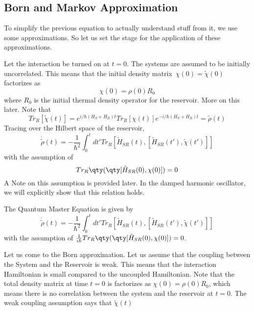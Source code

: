 \documentclass{scrartcl}
\newcommand{\1}{\mathbbm{1}}
\begin{document}
\subsection{Born and Markov Approximation}
To simplify the previous equation to actually understand stuff from it, we use some approximations. So let us set the stage
for the application of these approximations.

Let the interaction be turned on at $t=0$. The systems are assumed to be initially uncorrelated. This means that the initial density matrix\
$\chi(0) = \tilde{\chi}(0)$ factorizes as
\begin{equation}
	\chi(0) = \rho(0) R_0
\end{equation}
where $R_0$ is the initial thermal density operator for the reservoir. More on this later. Note that
\begin{equation*}
	Tr_R[\tilde{\chi}(t)] = e^{i\slash \hbar (H_S + H_R)t} Tr_R[\chi (t)] e^{-i\slash \hbar (H_S + H_R)t} = \tilde{\rho}(t)
\end{equation*}
Tracing over the Hilbert space of the reservoir,
\begin{equation*}
	\dot{\tilde{\rho}}(t) = -\frac{1}{\hbar^2} \int_0^t dt' Tr_R[\tilde{H}_{SR}(t), [\tilde{H}_{SR}(t'), \tilde{\chi}(t')]]
\end{equation*}
with the assumption of
\begin{equation}
	Tr_R\qty(\qty[\tilde{H}_{SR}(0),\chi (0)]) = 0
\end{equation}
A Note on this assumption is provided later. In the damped harmonic oscillator, we will explicitly show
that this relation holds.
\begin{definition}
	The Quantum Master Equation is given by
	\begin{equation}
		\dot{\tilde{\rho}}(t) = -\frac{1}{\hbar^2} \int_0^t dt' Tr_R[\tilde{H}_{SR}(t), [\tilde{H}_{SR}(t'), \tilde{\chi}(t')]]
	\end{equation}
	with the assumption of $\frac{1}{i\hbar} Tr_R\qty(\qty[\tilde{H}_{SR}(0),\chi (0)]) = 0$.
\end{definition}
Let us come to the Born approximation. Let us assume that the coupling between the System and the Reservoir is weak.
This means that the interaction Hamiltonian is small compared to the uncoupled Hamiltonian. Note that the total
density matrix at time $t=0$ is factorizes as $\chi(0) = \rho(0) R_0$, which means there is no correlation
between the system and the reservoir at $t=0$. The weak coupling assumption says that $\tilde{\chi}(t)$
\end{document}
